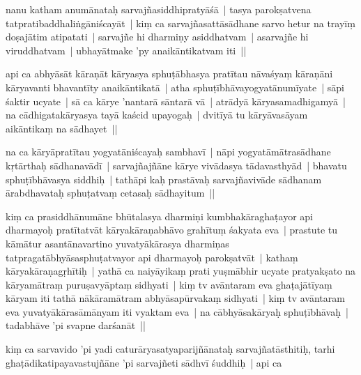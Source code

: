 \documentclass[article,12pt,a4paper]{memoir}%
\newcounter{parCount}
\begin{document}
	  
	  \pstart \leavevmode%
	\label{thakur75-3.29}nanu katham anumānataḥ sarvajñasiddhipratyāśā | tasya parokṣatvena tatpratibaddhaliṅgāniścayāt | kiṃ ca sarvajñasattāsādhane sarvo hetur na trayīṃ doṣajātim atipatati | sarvajñe hi dharmiṇy asiddhatvam | asarvajñe hi viruddhatvam | ubhayātmake 'py anaikāntikatvam iti || 
	{}
	\pend%
      

	  
	  \pstart \leavevmode%
	\label{thakur75-4.3}api ca abhyāsāt kāraṇāt kāryasya sphuṭābhasya pratītau nāvaśyaṃ kāraṇāni kāryavanti bhavantīty anaikāntikatā | atha sphuṭībhāvayogyatānumīyate | sāpi śaktir ucyate | sā ca kārye 'nantarā sāntarā vā | atrādyā kāryasamadhigamyā | na cādhigatakāryasya tayā kaścid upayogaḥ | dvitīyā tu kāryāvasāyam aikāntikaṃ na sādhayet || 
	{}
	\pend%
      

	  
	  \pstart \leavevmode%
	\label{thakur75-4.7}na ca kāryāpratītau yogyatāniścayaḥ sambhavī | nāpi yogyatāmātrasādhane kṛtārthaḥ sādhanavādī | sarvajñajñāne kārye vivādasya tādavasthyād | bhavatu sphuṭībhāvasya siddhiḥ | tathāpi kaḥ prastāvaḥ sarvajñavivāde sādhanam ārabdhavataḥ sphuṭatvaṃ cetasaḥ sādhayitum || 
	{}
	\pend%
      

	  
	  \pstart \leavevmode%
	\label{thakur75-4.11}kiṃ ca prasiddhānumāne bhūtalasya dharmiṇi kumbhakāraghaṭayor api dharmayoḥ pratītatvāt kāryakāraṇabhāvo grahītuṃ śakyata eva | prastute tu kāmātur asantānavartino yuvatyākārasya dharmiṇas tatpragatābhyāsasphuṭatvayor api dharmayoḥ parokṣatvāt | kathaṃ kāryakāraṇagṛhītiḥ | yathā ca naiyāyikaṃ prati yuṣmābhir ucyate pratyakṣato na kāryamātraṃ puruṣavyāptaṃ sidhyati | kiṃ tv avāntaram eva ghaṭajātīyaṃ kāryam iti tathā nākāramātram abhyāsapūrvakaṃ sidhyati | kiṃ tv avāntaram eva yuvatyākārasāmānyam iti vyaktam eva | na cābhyāsakāryaḥ sphuṭībhāvaḥ | tadabhāve 'pi svapne darśanāt || 
	{}
	\pend%
      

	  
	  \pstart \leavevmode%
	\label{thakur75-4.18}kiṃ ca sarvavido 'pi yadi caturāryasatyaparijñānataḥ sarvajñatāsthitiḥ, tarhi ghaṭādikatipayavastujñāne 'pi sarvajñeti sādhvī śuddhiḥ | api ca 
	{}
	\pend%
      
\end{document}
